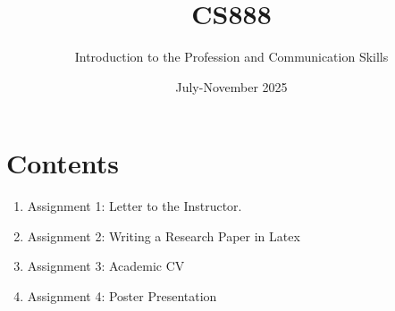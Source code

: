 \documentclass{article}
\title{CS888}
\author{Introduction to the Profession and Communication Skills}
\date{July-November 2025}
\begin{document}
\maketitle
\section{Contents}
\begin{enumerate}
    \item Assignment 1: Letter to the Instructor.
    \item Assignment 2: Writing a Research Paper in Latex
    \item Assignment 3: Academic CV
    \item Assignment 4: Poster Presentation
\end{enumerate}
\end{document}

